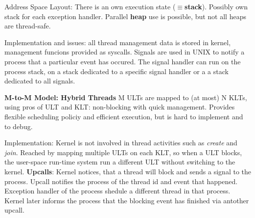 \documentclass[11pt,a4paper]{article}
\begin{document}
	Address Space Layout: There is an own execution state ($\equiv$\textbf{stack}). Possibly own stack for each exception handler. Parallel \textbf{heap} use is possible, but not all heaps are thread-safe.
	
	Implementation and issues: all thread management data is stored in kernel, management funcions provided as syscalls. Signals are used in UNIX to notify a process that a particular event has occured. The signal handler can run on the process stack, on a stack dedicated to a specific signal handler or a a stack dedicated to all signals. \newline
	
	\textbf{M-to-M Model: Hybrid Threads} \newline
	M ULTs are mapped to (at most) N KLTs, using pros of ULT and KLT: non-blocking with quick management. Provides flexible scheduling policiy and efficient execution, but is hard to implement and to debug.
	
	Implementation: Kernel is not involved in thread activities such as \textit{create} and \textit{join}. Reached by mapping multiple ULTs on each KLT, so when a ULT blocks, the user-space run-time system run a different ULT without switching to the kernel. \textbf{Upcalls}: Kernel notices, that a thread will block and sends a signal to the process. Upcall notifies the process of the thread id and event that happened. Exception handler of the process shedule a different thread in that process. Kernel later informs the process that the blocking event has finished via antother upcall.
	
	
	\newpage
	
	\printglossaries
	
	
	
\end{document}
